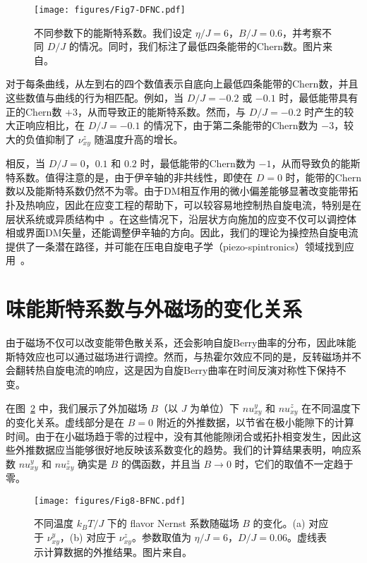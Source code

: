         \begin{figure}[th]
            \centering
            \texttt{[image: figures/Fig7-DFNC.pdf]}
            \caption{不同参数下的能斯特系数。我们设定 $\eta/J=6$，$B/J=0.6$，并考察不同 $D/J$ 的情况。同时，我们标注了最低四条能带的Chern数。图片来自\cite{lu2024Spin}。}
            \label{fig:dmi_with_t}
        \end{figure}
        
        对于每条曲线，从左到右的四个数值表示自底向上最低四条能带的Chern数，并且这些数值与曲线的行为相匹配。例如，当 ${D/J=-0.2}$ 或 $-0.1$ 时，最低能带具有正的Chern数 $+3$，从而导致正的能斯特系数。然而，与 $D/J=-0.2$ 时产生的较大正响应相比，在 $D/J=-0.1$ 的情况下，由于第二条能带的Chern数为 $-3$，较大的负值抑制了 $\nu^z_{xy}$ 随温度升高的增长。
        
        相反，当 $D/J=0$，$0.1$ 和 $0.2$ 时，最低能带的Chern数为 $-1$，从而导致负的能斯特系数。值得注意的是，由于伊辛轴的非共线性，即使在 $D=0$ 时，能带的Chern数以及能斯特系数仍然不为零。由于DM相互作用的微小偏差能够显著改变能带拓扑及热响应，因此在应变工程的帮助下，可以较容易地控制热自旋电流，特别是在层状系统或异质结构中~\cite{kim2020StrainEngineeringMagnetic,zhang2021strain,xu2022strain}。在这些情况下，沿层状方向施加的应变不仅可以调控体相或界面DM矢量，还能调整伊辛轴的方向。因此，我们的理论为操控热自旋电流提供了一条潜在路径，并可能在压电自旋电子学（piezo-spintronics）领域找到应用~\cite{nunez2014theory,ulloa2017piezospintronic,liu2019antiferromagnetic}。
        
    \section{味能斯特系数与外磁场的变化关系}
        由于磁场不仅可以改变能带色散关系，还会影响自旋Berry曲率的分布，因此味能斯特效应也可以通过磁场进行调控。然而，与热霍尔效应不同的是，反转磁场并不会翻转热自旋电流的响应，这是因为自旋Berry曲率在时间反演对称性下保持不变。

        在图~\ref{fig:Dz6_D0.06_B_T} 中，我们展示了外加磁场 $B$（以 $J$ 为单位）下 $
        nu^y_{xy}$ 和 $
        nu^z_{xy}$ 在不同温度下的变化关系。虚线部分是在 $B=0$ 附近的外推数据，以节省在极小能隙下的计算时间。由于在小磁场趋于零的过程中，没有其他能隙闭合或拓扑相变发生，因此这些外推数据应当能够很好地反映该系数变化的趋势。我们的计算结果表明，响应系数 $
        nu^y_{xy}$ 和 $
        nu^z_{xy}$ 确实是 $B$ 的偶函数，并且当 $B\to0$ 时，它们的取值不一定趋于零。
        \begin{figure}[htp]
            \centering
            \texttt{[image: figures/Fig8-BFNC.pdf]}
            \caption{不同温度 $k_B T/J$ 下的 flavor Nernst 系数随磁场 $B$ 的变化。(a) 对应于 $\nu^y_{xy}$，(b) 对应于 $\nu^z_{xy}$。参数取值为 $\eta/J=6$，$D/J=0.06$。虚线表示计算数据的外推结果。图片来自\cite{lu2024Spin}。}
            \label{fig:Dz6_D0.06_B_T}
        \end{figure}

